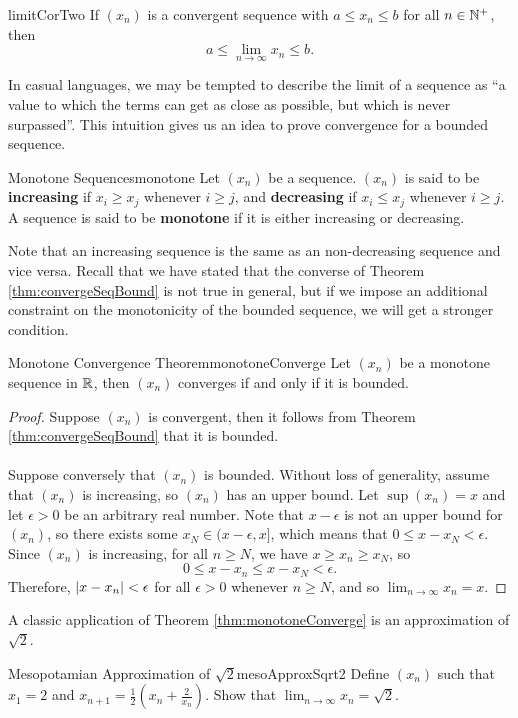 \documentclass[math]{amznotes}
\theoremstyle{remark}
\begin{document}
\begin{corbox}{}{limitCorTwo}
    If $(x_n)$ is a convergent sequence with $a \leq x_n \leq b$ for all $n \in \mathbb{N}^+$, then
    \begin{equation*}
        a \leq \lim_{n \to \infty}x_n \leq b.
    \end{equation*}
\end{corbox}
In casual languages, we may be tempted to describe the limit of a sequence as ``a value to which the terms can get as close as possible, but which is never surpassed''. This intuition gives us an idea to prove convergence for a bounded sequence.
\begin{dfnbox}{Monotone Sequences}{monotone}
    Let $(x_n)$ be a sequence. $(x_n)$ is said to be {\color{red} \textbf{increasing}} if $x_i \geq x_j$ whenever $i \geq j$, and {\color{red} \textbf{decreasing}} if $x_i \leq x_j$ whenever $i \geq j$. A sequence is said to be {\color{red} \textbf{monotone}} if it is either increasing or decreasing.
\end{dfnbox}
Note that an increasing sequence is the same as an non-decreasing sequence and vice versa. Recall that we have stated that the converse of Theorem \ref{thm:convergeSeqBound} is not true in general, but if we impose an additional constraint on the monotonicity of the bounded sequence, we will get a stronger condition.
\begin{thmbox}{Monotone Convergence Theorem}{monotoneConverge}
    Let $(x_n)$ be a monotone sequence in $\mathbb{R}$, then $(x_n)$ converges if and only if it is bounded.
    \tcblower
    \begin{proof}
        Suppose $(x_n)$ is convergent, then it follows from Theorem \ref{thm:convergeSeqBound} that it is bounded.
        \\\\
        Suppose conversely that $(x_n)$ is bounded. Without loss of generality, assume that $(x_n)$ is increasing, so $(x_n)$ has an upper bound. Let $\sup (x_n) = x$ and let $\epsilon > 0$ be an arbitrary real number. Note that $x - \epsilon$ is not an upper bound for $(x_n)$, so there exists some $x_N \in (x - \epsilon, x]$, which means that $0 \leq x - x_N < \epsilon$. Since $(x_n)$ is increasing, for all $n \geq N$, we have $x \geq x_n \geq x_N$, so
        \begin{equation*}
            0 \leq x - x_n \leq x - x_N < \epsilon.
        \end{equation*}
        Therefore, ${\left\lvert {x - x_n} \right\rvert} < \epsilon$ for all $\epsilon > 0$ whenever $n \geq N$, and so $\lim_{n \to \infty}x_n = x$.
    \end{proof}
\end{thmbox}
A classic application of Theorem \ref{thm:monotoneConverge} is an approximation of $\sqrt{2}$.
\begin{exbox}{Mesopotamian Approximation of $\sqrt{2}$}{mesoApproxSqrt2}
    Define $(x_n)$ such that $x_1 = 2$ and $x_{n + 1} = \frac{1}{2}\left(x_n + \frac{2}{x_n}\right)$. Show that $\lim_{n \to \infty}x_n = \sqrt{2}$.
\end{exbox}
\end{document}
